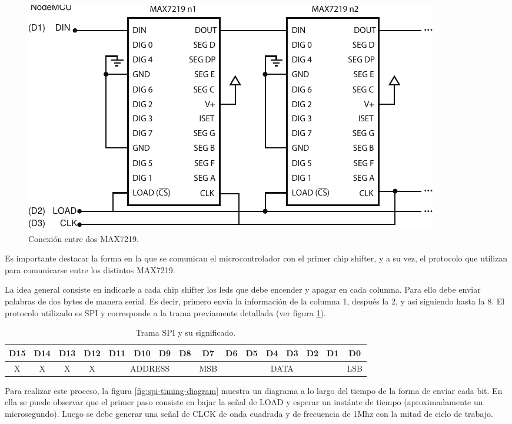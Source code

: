\begin{figure}[ht!]
	\centering
	\begin{center}
		\includegraphics[width=\textwidth]{imagenes/hw/MAX-daisychain.pdf}
		\caption{Conexión entre dos MAX7219.}
		\label{fig:MAX-MAX}
	\end{center}
\end{figure}
Es importante destacar la forma en la que se comunican el microcontrolador con el primer chip shifter, y a su vez, el protocolo que utilizan para comunicarse entre los distintos MAX7219.

La idea general consiste en indicarle a cada chip shifter los leds que debe encender y apagar en cada columna. Para ello debe enviar palabras de dos bytes de manera serial. Es decir, primero envía la información de la columna 1, después la 2, y así siguiendo hasta la 8. El protocolo utilizado es SPI y corresponde a la trama previamente detallada (ver figura \ref{table:trama-spi}).

\begin{table}[ht]
	\centering
	\caption{Trama SPI y su significado.}
	\label{table:trama-spi}
	\begin{adjustbox}{max width=\textwidth}
	\begin{tabular}{|c|c|c|c|c|c|c|c|c|c|c|c|c|c|c|c|}
	\hline
	D15 & D14 & D13 & D12 & D11   & D10   & D9   & D8   & D7 & D6 & D5 & D4 & D3 & D2 & D1 & D0 \\ \hline
	X   & X   & X   & X   & \multicolumn{4}{c|}{ADDRESS} & \multicolumn{1}{c}{ MSB } & \multicolumn{6}{c}{ DATA } & \multicolumn{1}{c|}{ LSB } \\ \hline
	\end{tabular}
	\end{adjustbox}
\end{table}

Para realizar este proceso, la figura \ref{fig:spi-timing-diagram} muestra un diagrama a lo largo del tiempo de la forma de enviar cada bit. En ella se puede observar que el primer paso consiste en bajar la señal de LOAD y esperar un instánte de tiempo (aproximadamente un microsegundo). Luego se debe generar una señal de CLCK de onda cuadrada y de frecuencia de 1Mhz con la mitad de ciclo de trabajo.

